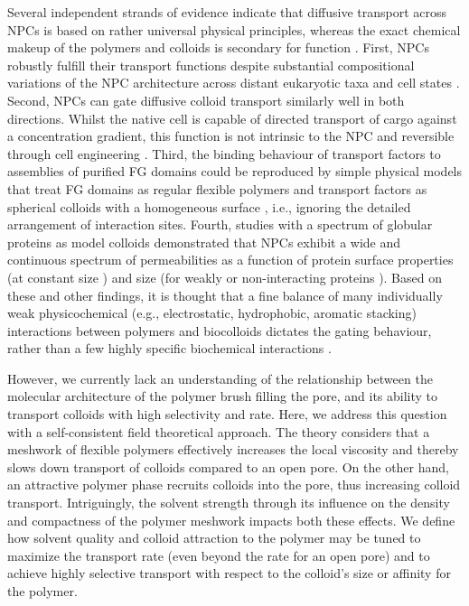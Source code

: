 \documentclass[12pt, a4paper]{article}
\begin{document}
Several independent strands of evidence indicate that diffusive transport across NPCs is based on rather universal physical principles, whereas the exact chemical makeup of the polymers and colloids is secondary for function \cite{Hoogenboom2021}.
First, NPCs robustly fulfill their transport functions despite substantial compositional variations of the NPC architecture across distant eukaryotic taxa and cell states \cite{VonAppen2015, Ori2013, Schmidt2015, Kim2018, Rajoo2018, Zimmerli2021}.
Second, NPCs can gate diffusive colloid transport similarly well in both directions.
Whilst the native cell is capable of directed transport of cargo against a concentration gradient, this function is not intrinsic to the NPC and reversible through cell engineering \cite{Nachury1999}.
Third, the binding behaviour of transport factors to assemblies of purified FG domains could be reproduced by simple physical models that treat FG domains as regular flexible polymers and transport factors as spherical colloids with a homogeneous surface \cite{Zahn2016, Vovk2016}, i.e., ignoring the detailed arrangement of interaction sites. 
Fourth, studies with a spectrum of globular proteins as model colloids demonstrated that NPCs exhibit a wide and continuous spectrum of permeabilities as a function of protein surface properties (at constant size \cite{Frey2018}) and size (for weakly or non-interacting proteins \cite{Ribbeck2001, Mohr2009, Popken2015, Timney2016}).
Based on these and other findings, it is thought that a fine balance of many individually weak physicochemical (e.g., electrostatic, hydrophobic, aromatic stacking) interactions between polymers and biocolloids dictates the gating behaviour, rather than a few highly specific biochemical interactions \cite{Hoogenboom2021}.

However, we currently lack an understanding of the relationship between the molecular architecture of the polymer brush filling the pore, and its ability to transport colloids with high selectivity and rate.
Here, we address this question with a self-consistent field theoretical approach.
The theory considers that a meshwork of flexible polymers effectively increases the local viscosity and thereby slows down transport of colloids compared to an open pore.
On the other hand, an attractive polymer phase recruits colloids into the pore, thus increasing colloid transport.
Intriguingly, the solvent strength through its influence on the density and compactness of the polymer meshwork impacts both these effects.
We define how solvent quality and colloid attraction to the polymer may be tuned to maximize the transport rate (even beyond the rate for an open pore) and to achieve highly selective transport with respect to the colloid's size or affinity for the polymer.
\end{document}
